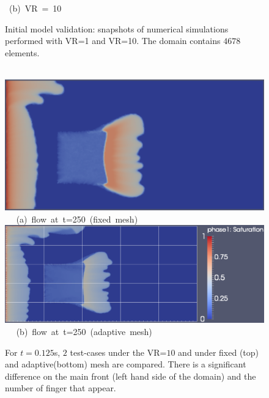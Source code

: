 \begin{landscape}
\begin{figure}[ht]
{      \hbox{\hspace{8.0cm} (b) VR = 10  }}
\caption{Initial model validation: snapshots of numerical simulations performed with VR=1 and VR=10. The domain contains $4678$ elements. }
\label{fem_cv_represent_vr1_vr10}
\end{figure}
\end{landscape}
\clearpage



\begin{landscape}
\begin{figure}[ht] 
\vbox{
\hbox{\hspace{3.5cm}
\includegraphics[width=.65\textwidth]{./Pics1/mr10_5regions_fixed/5regions_fixed_250.pdf} 
}
\vspace{0.0cm}
\hbox{\hspace{6.5cm} (a) flow at t=250 (fixed mesh)  
}
\vspace{0.25cm}
\hbox{\hspace{3.5cm}
\includegraphics[width=.9\textwidth]{./Pics1/mr10_5regions_adapt/5regions_adapt_250_1.pdf}
}
\vspace{0.0cm}
\hbox{\hspace{6.5cm} (b) flow at t=250 (adaptive mesh)    
}
}     
\caption{For $t=0.125$s, $2$ test-cases under the VR=$10$ and under fixed (top) and adaptive(bottom) mesh are compared. There is a significant difference on the main front (left hand side of the domain) and the number of finger that appear.}
\label{fig:2testcase_a}
\end{figure}
\end{landscape}
\clearpage



